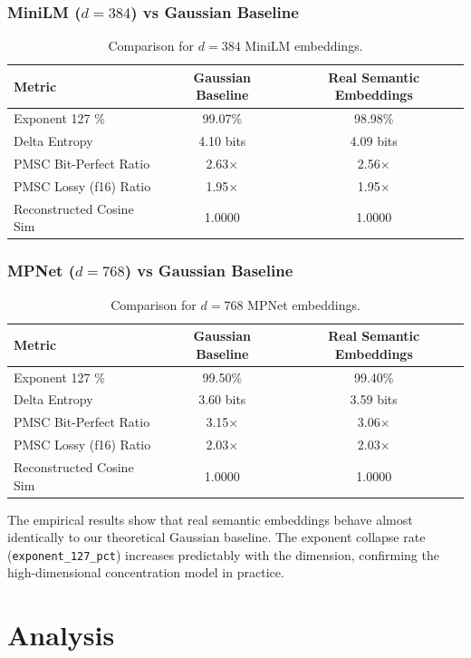 \documentclass[11pt,a4paper]{article}
\begin{document}
\subsubsection{MiniLM ($d=384$) vs Gaussian Baseline}
\begin{table}[h]
\centering
\begin{tabular}{lcc}
\toprule
\textbf{Metric} & \textbf{Gaussian Baseline} & \textbf{Real Semantic Embeddings} \\
\midrule
Exponent 127 \% & 99.07\% & 98.98\% \\
Delta Entropy & 4.10 bits & 4.09 bits \\
PMSC Bit-Perfect Ratio & 2.63$\times$ & 2.56$\times$ \\
PMSC Lossy (f16) Ratio & 1.95$\times$ & 1.95$\times$ \\
Reconstructed Cosine Sim & 1.0000 & 1.0000 \\
\bottomrule
\end{tabular}
\caption{Comparison for $d=384$ MiniLM embeddings.}
\end{table}

\subsubsection{MPNet ($d=768$) vs Gaussian Baseline}
\begin{table}[h]
\centering
\begin{tabular}{lcc}
\toprule
\textbf{Metric} & \textbf{Gaussian Baseline} & \textbf{Real Semantic Embeddings} \\
\midrule
Exponent 127 \% & 99.50\% & 99.40\% \\
Delta Entropy & 3.60 bits & 3.59 bits \\
PMSC Bit-Perfect Ratio & 3.15$\times$ & 3.06$\times$ \\
PMSC Lossy (f16) Ratio & 2.03$\times$ & 2.03$\times$ \\
Reconstructed Cosine Sim & 1.0000 & 1.0000 \\
\bottomrule
\end{tabular}
\caption{Comparison for $d=768$ MPNet embeddings.}
\end{table}

The empirical results show that real semantic embeddings behave almost identically to our theoretical Gaussian baseline. The exponent collapse rate (\texttt{exponent\_127\_pct}) increases predictably with the dimension, confirming the high-dimensional concentration model in practice.

\section{Analysis}
\label{sec:analysis}
\end{document}
